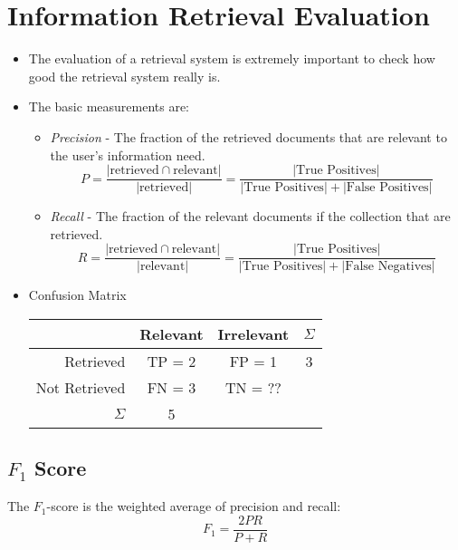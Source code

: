 \documentclass[a4paper, 11pt, accentcolor = tud3b]{tudreport}
\providecommand{\abs}[1]{\ensuremath{{\lvert #1 \rvert}}}
\begin{document}
        \section{Information Retrieval Evaluation} %
            \begin{itemize}
            	\item The evaluation of a retrieval system is extremely important to check how good the retrieval system really is.
            	\item The basic measurements are:
            		\begin{itemize}
            			\item \textit{Precision} - The fraction of the retrieved documents that are relevant to the user's information need.
            				\begin{equation*}
	            				P = \frac{\abs{\text{retrieved} \cap \text{relevant}}}{\abs{\text{retrieved}}} = \frac{\abs{\text{True Positives}}}{\abs{\text{True Positives}} + \abs{\text{False Positives}}}
            				\end{equation*}
            			\item \textit{Recall} - The fraction of the relevant documents if the collection that are retrieved.
            				\begin{equation*}
	            				R = \frac{\abs{\text{retrieved} \cap \text{relevant}}}{\abs{\text{relevant}}} = \frac{\abs{\text{True Positives}}}{\abs{\text{True Positives}} + \abs{\text{False Negatives}}}
            				\end{equation*}
            		\end{itemize}
            	\item Confusion Matrix
            		\begin{table}[H]
            			\centering
            			\begin{tabular}{r | c | c | c}
            				& Relevant & Irrelevant & \( \Sigma \) \\ \hline
            				Retrieved & TP = 2 & FP = 1 & 3 \\ \hline
            				Not Retrieved & FN = 3 & TN = ?? & \\ \hline
            				\(\Sigma\) & 5 & &
            			\end{tabular}
            		\end{table}
            \end{itemize}

            \subsection{\( F _ 1 \) Score} %
                The \(F_1\)-score is the weighted average of precision and recall:
                \begin{equation*}
	                F_1 = \frac{2PR}{P + R} \tag{Harmonic Mean of \(P\) and \(R\)}
                \end{equation*}
                
\end{document}
